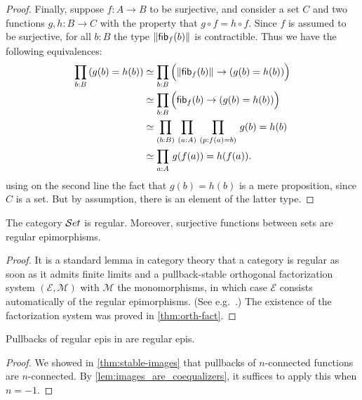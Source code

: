 \begin{proof}
Finally, suppose $f:A\to B$ to be surjective, and consider a set $C$ and two functions
$g,h:B\to C$ with the property that $g\circ f = h\circ f$. Since $f$ 
is assumed to be surjective, for all $b:B$ the type $\mathopen{}\left\Vert {\mathsf{fib}}_{f}(b)\right\Vert_{}\mathclose{}$ is contractible.
Thus we have the following equivalences:
\begin{align*}
\prd{b:B} (g(b)= h(b))
& \eqvsym \prd{b:B} \Parens{\brck{\hfib f b} \to (g(b)= h(b))}\\
& \eqvsym \prd{b:B} \Parens{\hfib f b \to (g(b)= h(b))}\\
& \eqvsym \prd{b:B}{a:A}{p:f(a)= b} g(b)= h(b)\\
& \eqvsym \prd{a:A} g(f(a))= h(f(a)).
\end{align*}
using on the second line the fact that $g(b)=h(b)$ is a mere proposition, since $C$ is a set.
But by assumption, there is an element of the latter type.
\end{proof}


\begin{thm}\label{thm:set_regular}\label{lem:images_are_coequalizers}
The category $\mathcal{S}et$ is regular. Moreover, surjective functions between sets are regular epimorphisms.
\end{thm}

\begin{proof}
It is a standard lemma in category theory that a category is regular as soon as it admits finite limits and a pullback-stable orthogonal 
factorization system $(\mathcal{E},\mathcal{M})$ with $\mathcal{M}$ the monomorphisms, in which case $\mathcal{E}$ consists automatically of 
the regular epimorphisms.
(See e.g.~\cite[A1.3.4]{elephant}.)
The existence of the factorization system was proved in \autoref{thm:orth-fact}.
\end{proof}

\begin{lem}\label{lem:pb_of_coeq_is_coeq}
Pullbacks of regular epis in \uset are regular epis.
\end{lem}
\begin{proof}
  We showed in \autoref{thm:stable-images} that pullbacks of $n$-connected functions are $n$-connected.
  By \autoref{lem:images_are_coequalizers}, it suffices to apply this when $n=-1$.
\end{proof}

